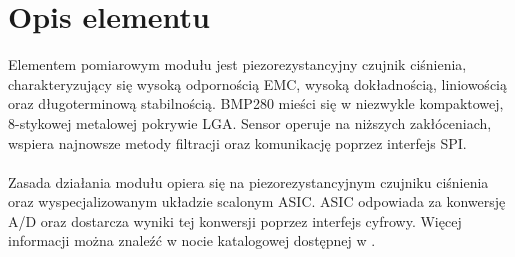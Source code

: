 \documentclass[11pt, a4paper]{article}
\author{Dawid Sobczak}
\begin{document}
%
%
\newpage

\section*{Opis elementu}
Elementem pomiarowym modułu jest piezorezystancyjny czujnik ciśnienia, charakteryzujący się wysoką odpornością EMC, wysoką dokładnością, liniowością oraz długoterminową stabilnością. BMP280 mieści się w niezwykle kompaktowej, 8-stykowej metalowej pokrywie LGA. Sensor operuje na niższych zakłóceniach, wspiera najnowsze metody filtracji oraz komunikację poprzez interfejs SPI. \\\\
Zasada działania modułu opiera się na piezorezystancyjnym czujniku ciśnienia oraz wyspecjalizowanym układzie scalonym ASIC. ASIC odpowiada za konwersję A/D oraz dostarcza wyniki tej konwersji poprzez interfejs cyfrowy.  Więcej informacji można znaleźć w nocie katalogowej dostępnej w \cite{bmp280_datasheet}.
\vspace{0.25cm}
\end{document}
